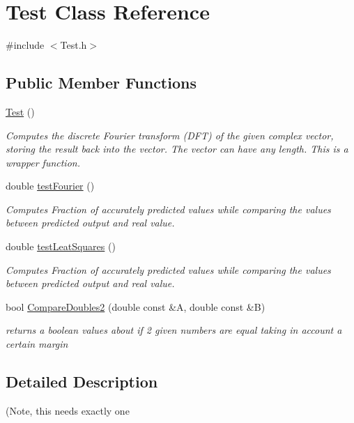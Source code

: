 \hypertarget{class_test}{}\section{Test Class Reference}
\label{class_test}


{\ttfamily \#include $<$Test.\+h$>$}

\subsection*{Public Member Functions}
\begin{DoxyCompactItemize}
\item 
\mbox{\hyperlink{class_test_a99f2bbfac6c95612322b0f10e607ebe5}{Test}} ()
\begin{DoxyCompactList}\small\item\em Computes the discrete Fourier transform (D\+FT) of the given complex vector, storing the result back into the vector. The vector can have any length. This is a wrapper function. \end{DoxyCompactList}\item 
double \mbox{\hyperlink{class_test_a4789b9d0192ae0a3c6f88a7777a6bc57}{test\+Fourier}} ()
\begin{DoxyCompactList}\small\item\em Computes Fraction of accurately predicted values while comparing the values between predicted output and real value. \end{DoxyCompactList}\item 
double \mbox{\hyperlink{class_test_a78c56bbcd0b2406cbd06dc1a317b225b}{test\+Leat\+Squares}} ()
\begin{DoxyCompactList}\small\item\em Computes Fraction of accurately predicted values while comparing the values between predicted output and real value. \end{DoxyCompactList}\item 
bool \mbox{\hyperlink{class_test_a22627e262a5cace5c5608c9dae4febff}{Compare\+Doubles2}} (double const \&A, double const \&B)
\begin{DoxyCompactList}\small\item\em returns a boolean values about if 2 given numbers are equal taking in account a certain margin \end{DoxyCompactList}\end{DoxyCompactItemize}


\subsection{Detailed Description}
(Note, this needs exactly one 

